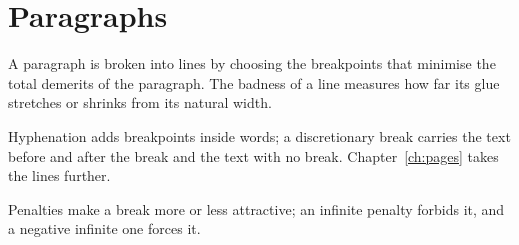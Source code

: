 \chapter{Paragraphs}\label{ch:par}
A paragraph is broken into lines by
choosing the breakpoints that minimise the total demerits
of the paragraph. The badness of a line measures how far its
glue stretches or shrinks from its natural width.

Hyphenation adds breakpoints inside words; a discretionary
break carries the text before and after the break and the
text with no break. Chapter~\ref{ch:pages} takes the lines further.

Penalties make a break more or less attractive; an infinite
penalty forbids it, and a negative infinite one forces it.
